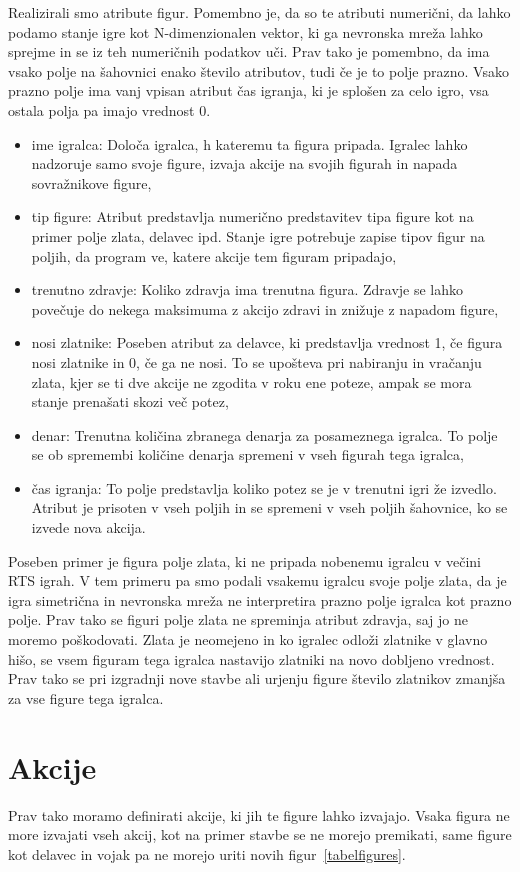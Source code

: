 \documentclass[a4paper, 12pt]{book}
\begin{document}
Realizirali smo atribute figur. Pomembno je, da so te atributi numerični, da lahko podamo stanje igre kot N-dimenzionalen vektor, ki ga nevronska mreža lahko sprejme in se iz teh numeričnih podatkov uči.
Prav tako je pomembno, da ima vsako polje na šahovnici enako število atributov, tudi če je to polje prazno.
Vsako prazno polje ima vanj vpisan atribut čas igranja, ki je splošen za celo igro, vsa ostala polja pa imajo vrednost 0.
\begin{itemize}
	\item ime igralca: Določa igralca, h kateremu ta figura pripada. Igralec lahko nadzoruje samo svoje figure, izvaja akcije na svojih figurah in napada sovražnikove figure,
	\item tip figure: Atribut predstavlja numerično predstavitev tipa figure kot na primer polje zlata, delavec ipd. Stanje igre potrebuje zapise tipov figur na poljih, da program ve, katere akcije tem figuram pripadajo,
	\item trenutno zdravje: Koliko zdravja ima trenutna figura. Zdravje se lahko povečuje do nekega maksimuma z akcijo zdravi in znižuje z napadom figure,
	\item nosi zlatnike: Poseben atribut za delavce, ki predstavlja vrednost 1, če figura nosi zlatnike in 0, če ga ne nosi. To se upošteva pri nabiranju in vračanju zlata, kjer se ti dve akcije ne zgodita v roku ene poteze, ampak se mora stanje prenašati skozi več potez,
	\item denar: Trenutna količina zbranega denarja za posameznega igralca. To polje se ob spremembi količine denarja spremeni v vseh figurah tega igralca,
	\item čas igranja: To polje predstavlja koliko potez se je v trenutni igri že izvedlo. Atribut je prisoten v vseh poljih in se spremeni v vseh poljih šahovnice, ko se izvede nova akcija.
\end{itemize}
Poseben primer je figura polje zlata, ki ne pripada nobenemu igralcu v večini RTS igrah. 
V tem primeru pa smo podali vsakemu igralcu svoje polje zlata, da je igra simetrična in nevronska mreža ne interpretira prazno polje igralca kot prazno polje.
Prav tako se figuri polje zlata ne spreminja atribut zdravja, saj jo ne moremo poškodovati. 
Zlata je neomejeno in ko igralec odloži zlatnike v glavno hišo, se vsem figuram tega igralca nastavijo zlatniki na novo dobljeno vrednost. 
Prav tako se pri izgradnji nove stavbe ali urjenju figure število zlatnikov zmanjša za vse figure tega igralca.

\section{Akcije}
Prav tako moramo definirati akcije, ki jih te figure lahko izvajajo. Vsaka figura ne more izvajati vseh akcij, kot na primer stavbe se ne morejo premikati, same figure kot delavec in vojak pa ne morejo uriti novih figur~\ref{tabelfigures}.
\end{document}
